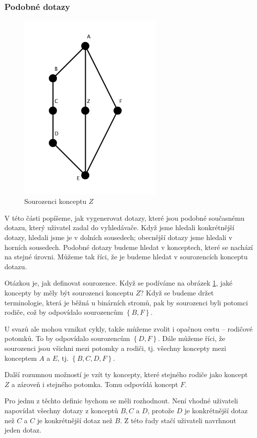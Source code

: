 \documentclass[12pt]{article}
\newcommand{\sssection}[1]{\subsubsection{#1}}
\newcommand{\adds}[1]{\left\{#1\right\}}
\begin{document}
\sssection{Podobné dotazy}
\begin{figure}
  \centering
  \includegraphics[width=7cm]{obrazky/siblings.pdf}
  \caption{Sourozenci konceptu $Z$}
  \label{fig.siblings}
\end{figure}

V této části popíšeme, jak vygenerovat dotazy, které jsou podobné současnému dotazu, který uživatel zadal do vyhledávače. Když jsme hledali konkrétnější dotazy, hledali jsme je v dolních sousedech; obecnější dotazy jsme hledali v horních sousedech. Podobné dotazy budeme hledat v konceptech, které se nachází na stejné úrovni. Můžeme tak říci, že je budeme hledat v sourozencích konceptu dotazu. 

Otázkou je, jak definovat sourozence. Když se podíváme na obrázek \ref{fig.siblings}, jaké koncepty by měly být sourozenci konceptu $Z$? Když se budeme držet terminologie, která je běžná u binárních stromů, pak by sourozenci byli potomci rodiče, což by odpovídalo sourozencům $\adds{B, F}$. 

U svazů ale mohou vznikat cykly, takže můžeme zvolit i opačnou cestu -- rodičové potomků. To by odpovídalo sourozencům $\adds{D, F}$. Dále můžeme říci, že sourozenci jsou všichni mezi potomky a rodiči, tj. všechny koncepty mezi konceptem $A$ a $E$, tj. $\adds{B, C, D, F}$. 

Další rozumnou možností je vzít ty koncepty, které stejného rodiče jako koncept $Z$ a zároveň i stejného potomka. Tomu odpovídá koncept $F$.

Pro jednu z těchto definic bychom se měli rozhodnout. Není vhodné uživateli napovídat všechny dotazy z konceptů $B, C$ a $D$, protože $D$ je konkrétnější dotaz než $C$ a $C$ je konkrétnější dotaz než $B$. Z této řady stačí uživateli navrhnout jeden dotaz. 
\end{document}
